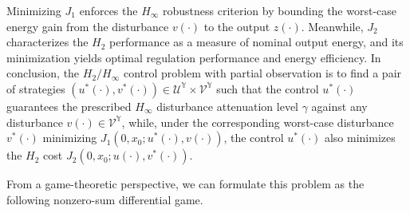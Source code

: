 \documentclass[lettersize,journal]{IEEEtran}
\theoremstyle{plain}
\theoremstyle{definition}
\begin{document}
Minimizing $J_1$ enforces the $H_\infty$ robustness criterion by bounding the worst-case energy gain from the disturbance $v(\cdot)$ to the output $z(\cdot)$. Meanwhile, $J_2$ characterizes the $H_2$ performance as a measure of nominal output energy, and its minimization yields optimal regulation performance and energy efficiency. In conclusion, the $H_2/H_{\infty}$ control problem with partial observation is to find a pair of strategies $(u^*(\cdot),v^*(\cdot)) \in \mathcal{U}^{\mathbb{Y}} \times \mathcal{V}^{\mathbb{Y}}$ such that the control $u^*(\cdot)$ guarantees the prescribed $H_\infty$ disturbance attenuation level $\gamma$ against any disturbance $v(\cdot)\in\mathcal{V}^{\mathbb{Y}}$, while, under the corresponding worst-case disturbance $v^*(\cdot)$ minimizing $J_1(0,x_0;u^*(\cdot),v(\cdot))$, the control $u^*(\cdot)$ also minimizes the $H_2$ cost $J_2(0,x_0;u(\cdot),v^*(\cdot))$.

From a game-theoretic perspective, we can formulate this problem as the following nonzero-sum differential game.
\end{document}
